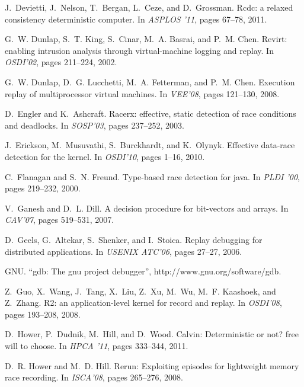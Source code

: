 \documentclass[10pt,onecolumn,letterpaper]{article}
\begin{document}
{\begin{thebibliography}{10}
J.~Devietti, J.~Nelson, T.~Bergan, L.~Ceze, and D.~Grossman.
\newblock Rcdc: a relaxed consistency deterministic computer.
\newblock In {\em ASPLOS '11}, pages 67--78, 2011.

G.~W. Dunlap, S.~T. King, S.~Cinar, M.~A. Basrai, and P.~M. Chen.
\newblock Revirt: enabling intrusion analysis through virtual-machine logging
  and replay.
\newblock In {\em OSDI'02}, pages 211--224, 2002.

G.~W. Dunlap, D.~G. Lucchetti, M.~A. Fetterman, and P.~M. Chen.
\newblock Execution replay of multiprocessor virtual machines.
\newblock In {\em VEE'08}, pages 121--130, 2008.

D.~Engler and K.~Ashcraft.
\newblock Racerx: effective, static detection of race conditions and deadlocks.
\newblock In {\em SOSP'03}, pages 237--252, 2003.

J.~Erickson, M.~Musuvathi, S.~Burckhardt, and K.~Olynyk.
\newblock Effective data-race detection for the kernel.
\newblock In {\em OSDI'10}, pages 1--16, 2010.

C.~Flanagan and S.~N. Freund.
\newblock Type-based race detection for java.
\newblock In {\em PLDI '00}, pages 219--232, 2000.

V.~Ganesh and D.~L. Dill.
\newblock A decision procedure for bit-vectors and arrays.
\newblock In {\em CAV'07}, pages 519--531, 2007.

D.~Geels, G.~Altekar, S.~Shenker, and I.~Stoica.
\newblock Replay debugging for distributed applications.
\newblock In {\em USENIX ATC'06}, pages 27--27, 2006.

GNU.
\newblock ``gdb: The gnu project debugger'', http://www.gnu.org/software/gdb.

Z.~Guo, X.~Wang, J.~Tang, X.~Liu, Z.~Xu, M.~Wu, M.~F. Kaashoek, and
Z.~Zhang.
\newblock R2: an application-level kernel for record and replay.
\newblock In {\em OSDI'08}, pages 193--208, 2008.

D.~Hower, P.~Dudnik, M.~Hill, and D.~Wood.
\newblock Calvin: Deterministic or not? free will to choose.
\newblock In {\em HPCA '11}, pages 333--344, 2011.

D.~R. Hower and M.~D. Hill.
\newblock Rerun: Exploiting episodes for lightweight memory race recording.
\newblock In {\em ISCA'08}, pages 265--276, 2008.


\end{thebibliography}}
\end{document}
